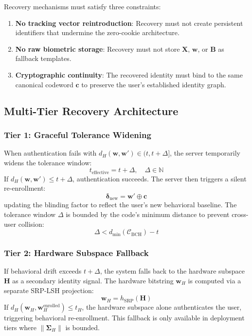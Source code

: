 \documentclass[11pt,twoside]{amsart}
\theoremstyle{plain}
\theoremstyle{definition}
\theoremstyle{remark}
\newcommand{\bX}{\mathbf{X}}
\newcommand{\bH}{\mathbf{H}}
\newcommand{\bB}{\mathbf{B}}
\newcommand{\bw}{\mathbf{w}}
\newcommand{\bc}{\mathbf{c}}
\newcommand{\bdelta}{\boldsymbol{\delta}}
\newcommand{\bSigma}{\boldsymbol{\Sigma}}
\newcommand{\calC}{\mathcal{C}}
\begin{document}
Recovery mechanisms must satisfy three constraints:
\begin{enumerate}
    \item \textbf{No tracking vector reintroduction}: Recovery must not create persistent identifiers that undermine the zero-cookie architecture.
    \item \textbf{No raw biometric storage}: Recovery must not store $\bX$, $\bw$, or $\bB$ as fallback templates.
    \item \textbf{Cryptographic continuity}: The recovered identity must bind to the same canonical codeword $\bc$ to preserve the user's established identity graph.
\end{enumerate}

\subsection{Multi-Tier Recovery Architecture}

\subsubsection{Tier 1: Graceful Tolerance Widening}

When authentication fails with $d_H(\bw, \bw') \in (t, t + \Delta]$, the server temporarily widens the tolerance window:
\begin{equation}
t_{\text{effective}} = t + \Delta, \quad \Delta \in \mathbb{N}
\end{equation}
If $d_H(\bw, \bw') \leq t + \Delta$, authentication succeeds. The server then triggers a silent re-enrollment:
\begin{equation}
\bdelta_{\text{new}} = \bw' \oplus \bc
\end{equation}
updating the blinding factor to reflect the user's new behavioral baseline. The tolerance window $\Delta$ is bounded by the code's minimum distance to prevent cross-user collision:
\begin{equation}
\Delta < d_{\min}(\calC_{\text{BCH}}) - t
\end{equation}

\subsubsection{Tier 2: Hardware Subspace Fallback}

If behavioral drift exceeds $t + \Delta$, the system falls back to the hardware subspace $\bH$ as a secondary identity signal. The hardware bitstring $\bw_H$ is computed via a separate SRP-LSH projection:
\begin{equation}
\bw_H = h_{\text{SRP}}(\bH)
\end{equation}
If $d_H(\bw_H, \bw_H^{\text{enrolled}}) \leq t_H$, the hardware subspace alone authenticates the user, triggering behavioral re-enrollment. This fallback is only available in deployment tiers where $\|\bSigma_H\|$ is bounded.
\end{document}

